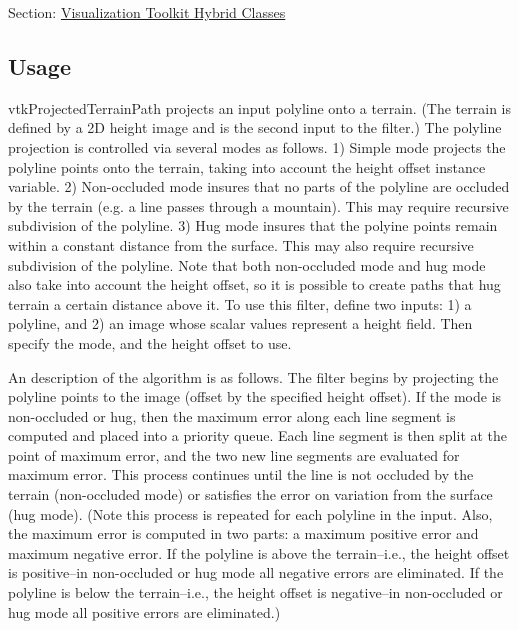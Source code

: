 Section\-: \hyperlink{sec_vtkhybrid}{Visualization Toolkit Hybrid Classes} \hypertarget{vtkwidgets_vtkxyplotwidget_Usage}{}\subsection{Usage}\label{vtkwidgets_vtkxyplotwidget_Usage}
vtk\-Projected\-Terrain\-Path projects an input polyline onto a terrain. (The terrain is defined by a 2\-D height image and is the second input to the filter.) The polyline projection is controlled via several modes as follows. 1) Simple mode projects the polyline points onto the terrain, taking into account the height offset instance variable. 2) Non-\/occluded mode insures that no parts of the polyline are occluded by the terrain (e.\-g. a line passes through a mountain). This may require recursive subdivision of the polyline. 3) Hug mode insures that the polyine points remain within a constant distance from the surface. This may also require recursive subdivision of the polyline. Note that both non-\/occluded mode and hug mode also take into account the height offset, so it is possible to create paths that hug terrain a certain distance above it. To use this filter, define two inputs\-: 1) a polyline, and 2) an image whose scalar values represent a height field. Then specify the mode, and the height offset to use.

An description of the algorithm is as follows. The filter begins by projecting the polyline points to the image (offset by the specified height offset). If the mode is non-\/occluded or hug, then the maximum error along each line segment is computed and placed into a priority queue. Each line segment is then split at the point of maximum error, and the two new line segments are evaluated for maximum error. This process continues until the line is not occluded by the terrain (non-\/occluded mode) or satisfies the error on variation from the surface (hug mode). (Note this process is repeated for each polyline in the input. Also, the maximum error is computed in two parts\-: a maximum positive error and maximum negative error. If the polyline is above the terrain--i.\-e., the height offset is positive--in non-\/occluded or hug mode all negative errors are eliminated. If the polyline is below the terrain--i.\-e., the height offset is negative--in non-\/occluded or hug mode all positive errors are eliminated.)

